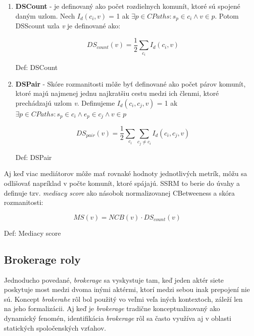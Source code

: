 \documentclass[slovak,master,public,dept460,male,cpdeclaration,oneside]{diploma}
\begin{document}
\begin{sloppypar}
\begin{enumerate}
\item 

\textbf{DSCount} - je definovaný ako počet rozdielnych komunít, ktoré sú spojené daným uzlom. Nech \textit{${I_d}({c_i}, v)$} = 1 ak \textit{${\exists p \in CPaths: {s_p} \in {c_i} \wedge	v \in p}$}. Potom DSScount uzla \textit{v} je definované ako:


\begin{mycapequ}[!ht]
   \begin{equation*}
    DS_{count}(v) = \frac{1}{2}\sum_{c_{i}} I_{d}(c_{i},v)
   \end{equation*}
   \caption{Def: DSCount}
\end{mycapequ}


\item \textbf{DSPair} - Skóre rozmanitosti môže byť definované ako počet párov komunít, ktoré majú najmenej jednu najkratšiu cestu medzi ich členmi, ktoré prechádzajú uzlom \textit{v}. Definujeme  \textit{${I_d}({c_i},{c_j}, v)$} = 1 ak \textit{${\exists p \in CPaths: {s_p} \in {c_i} \wedge {e_p} \in {c_j} \wedge	v \in p}$}


\begin{mycapequ}[!ht]
   \begin{equation*}
   DS_{pair}(v) = \frac{1}{2}\sum_{c_{i}} \sum_{c_{j}\neq c_{i}} I_{d}(c_{i},c_{j},v)
   \end{equation*}
   \caption{Def: DSPair}
\end{mycapequ}



\end{enumerate}
\end{sloppypar}

Aj keď viac mediátorov môže mať rovnaké hodnoty jednotlivých metrík, 
môžu sa odlišovať napríklad v počte komunít, ktoré spájajú. SSRM to berie do úvahy a definuje tzv. \textit{mediacy score} ako násobok normalizovanej CBetweeness a skóra rozmanitosti:

\begin{mycapequ}[!ht]
   \begin{equation*}
 		MS(v) = NCB(v) \cdot DS_{count}(v) 
   \end{equation*}
   \caption{Def: Mediacy score}
\end{mycapequ}


\subsection{Brokerage roly}
Jednoducho povedané, \textit{brokerage} sa vyskystuje tam, keď jeden aktér siete poskytuje most medzi dvoma inými aktérmi, ktorí medzi sebou inak prepojení nie sú. Koncept \textit{brokerahe} rôl bol použitý vo veľmi veľa iných kontextoch, záleží len na jeho formalizácii. Aj keď je \textit{brokerage} tradične konceptualizovaný ako dynamický fenomén, identifikácia \textit{brokerage} rôl sa často využíva aj v oblasti statických spoločenských vzťahov. 
\end{document}
